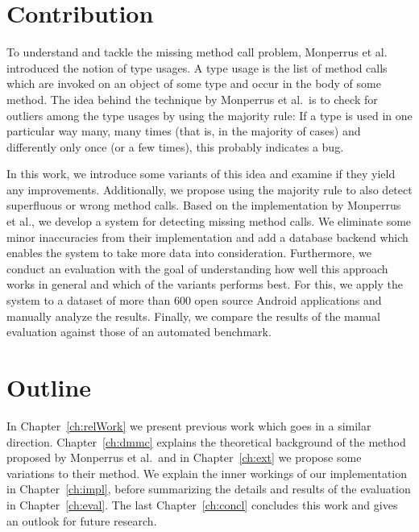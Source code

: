
\section{Contribution}

To understand and tackle the missing method call problem, Monperrus et al.~\cite{monperrus2010detecting}\cite{monperrus2013detecting} introduced the notion of type usages.
A type usage is the list of method calls which are invoked on an object of some type and occur in the body of some method.
The idea behind the technique by Monperrus et al.\ is to check for outliers among the type usages by using the majority rule:
If a type is used in one particular way many, many times (that is, in the majority of cases) and differently only once (or a few times), this probably indicates a bug.

In this work, we introduce some variants of this idea and examine if they yield any improvements.
Additionally, we propose using the majority rule to also detect superfluous or wrong method calls.
Based on the implementation by Monperrus et al., we develop a system for detecting missing method calls.
We eliminate some minor inaccuracies from their implementation and add a database backend which enables the system to take more data into consideration.
Furthermore, we conduct an evaluation with the goal of understanding how well this approach works in general and which of the variants performs best.
For this, we apply the system to a dataset of more than 600 open source Android applications and manually analyze the results.
Finally, we compare the results of the manual evaluation against those of an automated benchmark.

\section{Outline}

In Chapter~\ref{ch:relWork} we present previous work which goes in a similar direction.
Chapter~\ref{ch:dmmc} explains the theoretical background of the method proposed by Monperrus et al.\ and in Chapter~\ref{ch:ext} we propose some variations to their method.
We explain the inner workings of our implementation in Chapter~\ref{ch:impl}, before summarizing the details and results of the evaluation in Chapter~\ref{ch:eval}.
The last Chapter~\ref{ch:concl} concludes this work and gives an outlook for future research.

